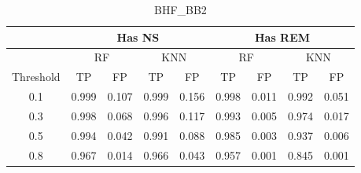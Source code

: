 \begin{table}[]
\centering
\begin{tabular}{@{}c|cccc|cccc@{}}
\toprule
\multicolumn{1}{l|}{}          & \multicolumn{4}{c|}{Has NS}                       & \multicolumn{4}{c}{Has REM}                      \\ \midrule
                               & \multicolumn{2}{c}{RF} & \multicolumn{2}{c|}{KNN} & \multicolumn{2}{c}{RF} & \multicolumn{2}{c}{KNN} \\
\multicolumn{1}{l|}{Threshold} & TP         & FP        & TP          & FP         & TP         & FP        & TP         & FP         \\ \midrule
0.1                            & 0.999      & 0.107     &   0.999          &  0.156          & 0.998      & 0.011     &    0.992        &  0.051          \\
0.3                            & 0.998      & 0.068     &   0.996        &  0.117          & 0.993      & 0.005     &   0.974         &  0.017          \\
0.5                            & 0.994      & 0.042     &   0.991          &  0.088           & 0.985      & 0.003     &   0.937         &  0.006          \\
0.8                            & 0.967      & 0.014     &   0.966          & 0.043            & 0.957      & 0.001     &  0.845          &   0.001         \\ \bottomrule
\end{tabular}
\caption{BHF\_BB2}
\label{tab:TPbhf}
\end{table}



